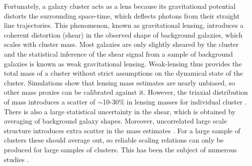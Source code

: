 \documentclass[useAMS,usenatbib]{mnras}
\begin{document}
Fortunately, a galaxy cluster acts as a lens because its gravitational potential distorts the surrounding space-time, which deflects photons from their straight line trajectories. This phenomenon, known as gravitational lensing, introduces a coherent distortion (shear) in the observed shape of background galaxies, which scales with cluster mass. Most galaxies are only slightly sheared by the cluster and the statistical inference of the shear signal from a sample of background galaxies is known as weak gravitational lensing. Weak-lensing thus provides the total mass of a cluster without strict assumptions on the dynamical state of the cluster. Simulations show that lensing mass estimates are nearly unbiased, so other mass proxies can be calibrated against it. However, the triaxial distribution of mass introduces a scatter of $\sim$10-30\% in lensing masses for individual cluster \citep{becker11, rasia12, bahe12, henson17,herbonnet19}. There is also a large statistical uncertainty in the shear, which is obtained by averaging of background galaxy shapes. Moreover, uncorrelated large scale structure introduces extra scatter in the mass estimates \citep{hoekstra01, hoekstra11}. For a large sample of clusters these should average out, so reliable scaling relations can only be produced for large samples of clusters.
This has been the subject of numerous studies \citep[e.g.][]{okabe13, umetsu14, vonderlinden14, hoekstra15, okabe16, schrabback18,mcclintock18, miyatake19, bellagamba19,nagarajan19}.


\end{document}
